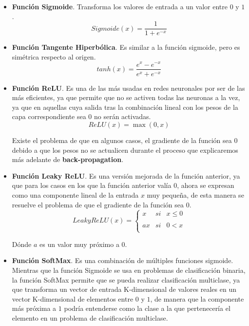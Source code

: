         \begin{itemize}
            \item \textbf{Función Sigmoide}. Transforma los valores de entrada a un valor entre $0$ y $1$.
            \begin{equation}
                Sigmoide(x)=\frac{1}{1+e^{-x}}
            \end{equation}
            \item \textbf{Función Tangente Hiperbólica}. Es similar a la función sigmoide, pero es simétrica respecto al origen. 
            \begin{equation}
                tanh(x)=\frac{e^x - e^{-x}}{e^x + e^{-x}} 
            \end{equation}
            \item \textbf{Función ReLU}. Es una de las más usadas en redes neuronales por ser de las más eficientes, ya que permite que no se activen todas las neuronas a la vez, ya que en aquellas cuya salida tras la combinación lineal con los pesos de la capa correspondiente sea 0 no serán activadas.
            \begin{equation}
                ReLU(x)=\max(0,x)
            \end{equation}

            \noindent Existe el problema de que en algunos casos, el gradiente de la función sea $0$ debido a que los pesos no se actualicen durante el proceso que explicaremos más adelante de \textbf{back-propagation}.

            \item \textbf{Función Leaky ReLU}. Es una versión mejorada de la función anterior, ya que para los casos en los que la función anterior valía $0$, ahora se expresan como una componente lineal de la entrada $x$ muy pequeña, de esta manera se resuelve el problema de que el gradiente de la función sea $0$. 
            \begin{equation}
                LeakyReLU(x)=\left\{ \begin{array}{lcc}
                    x &   si  & x \leq 0 \\
                    \\ ax &  si & 0 < x \\
                    \end{array}
                \right.
            \end{equation}

            \noindent Dónde $a$ es un valor muy próximo a $0$.
            \item \textbf{Función SoftMax}. Es una combinación de múltiples funciones sigmoide. Mientras que la función Sigmoide se usa en problemas de clasificación binaria, la función SoftMax permite que se pueda realizar clasificación multiclase, ya que transforma un vector de entrada K-dimensional de valores reales en un vector K-dimensional de elementos entre $0$ y $1$, de manera que la componente más próxima a $1$ podría entenderse como la clase a la que pertenecería el elemento en un problema de clasificación multiclase.
            

\end{itemize}
